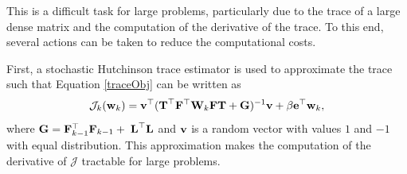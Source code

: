 \documentclass[12pt]{article}
\newcommand {\bfv}   { {\bf v} }
\newcommand {\bfe}   { {\bf e} }
\newcommand {\bfw}   { {\bf w} }
\newcommand{\bF}  { {\bf F} }      %
\newcommand{\bG}  { {\bf G} }      %
\newcommand{\bT}  {\text{\bf T}} %
\newcommand{\bfW}  {\text{{\bf W}}} %
\newcommand{\bfL}  {\text{{\bf L}}} %
\newcommand{\JJ}  {\mathcal{J}}    %
\begin{document}
This is a difficult task for large problems, particularly due to the trace of a large dense matrix and the computation of the derivative of the trace. To this end, several actions can be taken to reduce the computational costs.

First, a stochastic Hutchinson trace estimator is used to approximate the trace  \cite{Hutchinson1989} such that Equation \eqref{traceObj} can be written as
\begin{equation}
\label{Obj}
\JJ_k(\bfw_k) = \bfv^{\top}(\bT^{\top} \bF^{\top} \bfW_k \bF \bT  + \bG)^{-1}\bfv + \beta \bfe^{\top}\bfw_k,
\end{equation}
where $\bG = \bF_{k-1}^{\top}\bF_{k-1} + \;\bfL^{\top}\bfL$ and $\bfv$ is a random vector with values $1$ and $-1$ with equal distribution. This approximation makes the computation of the derivative of $\JJ$ tractable for large problems. \\
\end{document}
